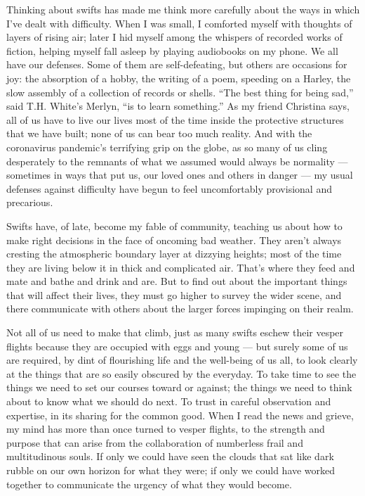 Thinking about swifts has made me think more carefully about the ways in
which I've dealt with difficulty. When I was small, I comforted myself
with thoughts of layers of rising air; later I hid myself among the
whispers of recorded works of fiction, helping myself fall asleep by
playing audiobooks on my phone. We all have our defenses. Some of them
are self-defeating, but others are occasions for joy: the absorption of
a hobby, the writing of a poem, speeding on a Harley, the slow assembly
of a collection of records or shells. ``The best thing for being sad,''
said T.H. White's Merlyn, ``is to learn something.'' As my friend
Christina says, all of us have to live our lives most of the time inside
the protective structures that we have built; none of us can bear too
much reality. And with the coronavirus pandemic's terrifying grip on the
globe, as so many of us cling desperately to the remnants of what we
assumed would always be normality --- sometimes in ways that put us, our
loved ones and others in danger --- my usual defenses against difficulty
have begun to feel uncomfortably provisional and precarious.

Swifts have, of late, become my fable of community, teaching us about
how to make right decisions in the face of oncoming bad weather. They
aren't always cresting the atmospheric boundary layer at dizzying
heights; most of the time they are living below it in thick and
complicated air. That's where they feed and mate and bathe and drink and
are. But to find out about the important things that will affect their
lives, they must go higher to survey the wider scene, and there
communicate with others about the larger forces impinging on their
realm.

Not all of us need to make that climb, just as many swifts eschew their
vesper flights because they are occupied with eggs and young --- but
surely some of us are required, by dint of flourishing life and the
well-being of us all, to look clearly at the things that are so easily
obscured by the everyday. To take time to see the things we need to set
our courses toward or against; the things we need to think about to know
what we should do next. To trust in careful observation and expertise,
in its sharing for the common good. When I read the news and grieve, my
mind has more than once turned to vesper flights, to the strength and
purpose that can arise from the collaboration of numberless frail and
multitudinous souls. If only we could have seen the clouds that sat like
dark rubble on our own horizon for what they were; if only we could have
worked together to communicate the urgency of what they would become.


